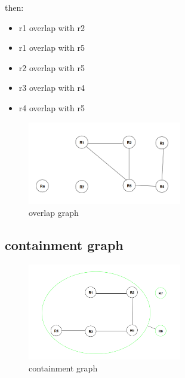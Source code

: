 \documentclass[]{article}
\begin{document}
then:

\begin{itemize}

\item r1 overlap with r2
\item r1 overlap with r5
\item r2 overlap with r5
\item r3 overlap with r4
\item r4 overlap with r5


\end{itemize}












\begin{figure}[H]
	\begin{center}
		\includegraphics[width=0.6\textwidth]{overlap_graph.png}
		\caption{overlap graph}
	\end{center}
\end{figure}


\subsection{containment graph}

\begin{figure}[H]
	\begin{center}
		\includegraphics[width=0.6\textwidth]{cont_graph.png}
		\caption{containment graph}
	\end{center}
\end{figure}
\end{document}

